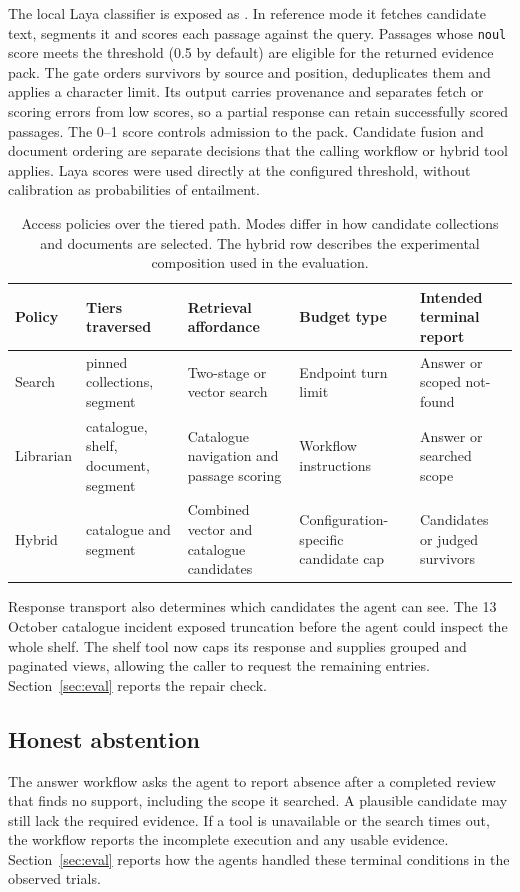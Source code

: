 The local Laya classifier \cite{laya} is exposed as .
In reference mode it fetches candidate text, segments it and scores each
passage against the query. Passages whose \texttt{noul} score meets the
threshold (0.5 by default) are eligible for the returned evidence pack.
The gate orders survivors by source and position, deduplicates them and
applies a character limit. Its output carries provenance and separates
fetch or scoring errors from low scores, so a partial response can
retain successfully scored passages. The 0--1 score controls admission
to the pack. Candidate fusion and document ordering are separate
decisions that the calling workflow or hybrid tool applies. Laya scores
were used directly at the configured threshold, without calibration as
probabilities of entailment.

\begin{table}[t]
\centering
\small
\setlength{\tabcolsep}{5pt}
\caption{Access policies over the tiered path. Modes differ in how candidate collections and documents are selected.
The hybrid row describes the experimental composition used in the evaluation.}
\label{tab:lanes}
\begin{tabular}{@{}>{\raggedright\arraybackslash}p{}>{\raggedright\arraybackslash}p{}>{\raggedright\arraybackslash}p{}>{\raggedright\arraybackslash}p{}>{\raggedright\arraybackslash}p{}@{}}
\toprule
Policy & Tiers traversed & Retrieval affordance & Budget type & Intended terminal report\\
\midrule
Search & pinned collections, segment & Two-stage or vector search & Endpoint turn limit & Answer or scoped not-found\\
Librarian & catalogue, shelf, document, segment & Catalogue navigation and passage scoring & Workflow instructions & Answer or searched scope\\
Hybrid & catalogue and segment & Combined vector and catalogue candidates & Configuration-specific candidate cap & Candidates or judged survivors\\
\bottomrule
\end{tabular}
\end{table}

Response transport also determines which candidates the agent can see.
The 13 October catalogue incident exposed truncation before the agent
could inspect the whole shelf. The shelf tool now caps its response and
supplies grouped and paginated views, allowing the caller to request the
remaining entries. Section~\ref{sec:eval} reports the repair check.

\subsection{Honest abstention}
The answer workflow asks the agent to report absence after a completed
review that finds no support, including the scope it searched. A plausible
candidate may still lack the required evidence. If a tool is unavailable
or the search times out, the workflow reports the incomplete execution
and any usable evidence. Section~\ref{sec:eval} reports how the agents
handled these terminal conditions in the observed trials.
